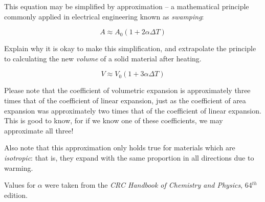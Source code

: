 \vskip 10pt

This equation may be simplified by approximation -- a mathematical principle commonly applied in electrical engineering known as {\it swamping}:

$$A \approx A_0 (1 + 2 \alpha \Delta T)$$

Explain why it is okay to make this simplification, and extrapolate the principle to calculating the new {\it volume} of a solid material after heating.







$$V \approx V_0 (1 + 3 \alpha \Delta T)$$







Please note that the coefficient of volumetric expansion is approximately three times that of the coefficient of linear expansion, just as the coefficient of area expansion was approximately two times that of the coefficient of linear expansion.  This is good to know, for if we know one of these coefficients, we may approximate all three!

Also note that this approximation only holds true for materials which are {\it isotropic}: that is, they expand with the same proportion in all directions due to warming.

\vskip 10pt

Values for $\alpha$ were taken from the {\it CRC Handbook of Chemistry and Physics}, 64$^{th}$ edition.





